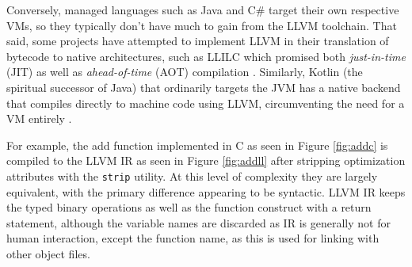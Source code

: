 \documentclass{article}
\begin{document}
Conversely, managed languages such as Java and C\# target their own respective VMs, so they typically don't have much to gain from the LLVM toolchain. That said, some projects have attempted to implement LLVM in their translation of bytecode to native architectures,  such as LLILC which promised both \textit{just-in-time} (JIT) as well as \textit{ahead-of-time} (AOT) compilation \cite{dotnet}. Similarly, Kotlin (the spiritual successor of Java) that ordinarily targets the JVM has a native backend that compiles directly to machine code using LLVM, circumventing the need for a VM entirely \cite{kotlin}.

For example, the add function implemented in C as seen in Figure \ref{fig:addc} is compiled to the LLVM IR as seen in Figure \ref{fig:addll} after stripping optimization attributes with the \texttt{strip} utility. At this level of complexity they are largely equivalent, with the primary difference appearing to be syntactic. LLVM IR keeps the typed binary operations as well as the function construct with a return statement, although the variable names are discarded as IR is generally not for human interaction, except the function name, as this is used for linking with other object files. 
\end{document}
